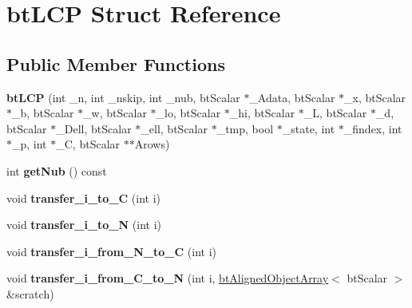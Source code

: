\hypertarget{structbt_l_c_p}{\section{bt\+L\+C\+P Struct Reference}
\label{structbt_l_c_p}
}
\subsection*{Public Member Functions}
\begin{DoxyCompactItemize}
\item 
\hypertarget{structbt_l_c_p_a3b93bdc126485234ed4b25b3c43cbe3b}{{\bfseries bt\+L\+C\+P} (int \+\_\+n, int \+\_\+nskip, int \+\_\+nub, bt\+Scalar $\ast$\+\_\+\+Adata, bt\+Scalar $\ast$\+\_\+x, bt\+Scalar $\ast$\+\_\+b, bt\+Scalar $\ast$\+\_\+w, bt\+Scalar $\ast$\+\_\+lo, bt\+Scalar $\ast$\+\_\+hi, bt\+Scalar $\ast$\+\_\+\+L, bt\+Scalar $\ast$\+\_\+d, bt\+Scalar $\ast$\+\_\+\+Dell, bt\+Scalar $\ast$\+\_\+ell, bt\+Scalar $\ast$\+\_\+tmp, bool $\ast$\+\_\+state, int $\ast$\+\_\+findex, int $\ast$\+\_\+p, int $\ast$\+\_\+\+C, bt\+Scalar $\ast$$\ast$Arows)}\label{structbt_l_c_p_a3b93bdc126485234ed4b25b3c43cbe3b}

\item 
\hypertarget{structbt_l_c_p_a6a6d902671b7b4b3de5f3dbe59bf97ff}{int {\bfseries get\+Nub} () const }\label{structbt_l_c_p_a6a6d902671b7b4b3de5f3dbe59bf97ff}

\item 
\hypertarget{structbt_l_c_p_abb2bd986398389b62d9428642e157d3d}{void {\bfseries transfer\+\_\+i\+\_\+to\+\_\+\+C} (int i)}\label{structbt_l_c_p_abb2bd986398389b62d9428642e157d3d}

\item 
\hypertarget{structbt_l_c_p_a6078eafa2e4e2c1687cec0393ecca84b}{void {\bfseries transfer\+\_\+i\+\_\+to\+\_\+\+N} (int i)}\label{structbt_l_c_p_a6078eafa2e4e2c1687cec0393ecca84b}

\item 
\hypertarget{structbt_l_c_p_a799932d89b0afff17e1620aec228fe3a}{void {\bfseries transfer\+\_\+i\+\_\+from\+\_\+\+N\+\_\+to\+\_\+\+C} (int i)}\label{structbt_l_c_p_a799932d89b0afff17e1620aec228fe3a}

\item 
\hypertarget{structbt_l_c_p_af1ecdf66b5febdba9333b1645dce328a}{void {\bfseries transfer\+\_\+i\+\_\+from\+\_\+\+C\+\_\+to\+\_\+\+N} (int i, \hyperlink{classbt_aligned_object_array}{bt\+Aligned\+Object\+Array}$<$ bt\+Scalar $>$ \&scratch)}\label{structbt_l_c_p_af1ecdf66b5febdba9333b1645dce328a}


\end{DoxyCompactItemize}
